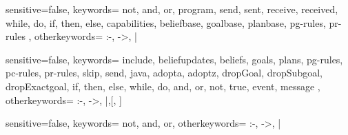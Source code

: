 \lstset{
	captionpos=b,
	commentstyle=\itshape,
	identifierstyle=\ttfamily,
	basicstyle=\normalsize
	}
\renewcommand\lstlistingname{Code fragment}


{sensitive=false,
 keywords={	not, and, or, program, send, sent, receive, received, while, do, if,
						then, else, capabilities, beliefbase, goalbase, planbase, pg-rules,
						pr-rules },
 otherkeywords={ :-, ->, | }
}


{sensitive=false,
 keywords={ include, beliefupdates, beliefs, goals, plans, pg-rules, pc-rules,
 pr-rules, skip, send, java, adopta, adoptz, dropGoal, dropSubgoal,
 dropExactgoal, if, then, else, while, do, and, or, not, true, event, message },
 otherkeywords={ :-, ->, |,[, ] }
}


{sensitive=false,
 keywords={	not, and, or},
 otherkeywords={ :-, ->, | }
}


\newcommand{\iapapl}[1]{\lstinline[language=2APL]!#1!}



\newcommand{\apapl}[3]{ %
  \begin{figure}[ht]
    
	\end{figure}	
}

